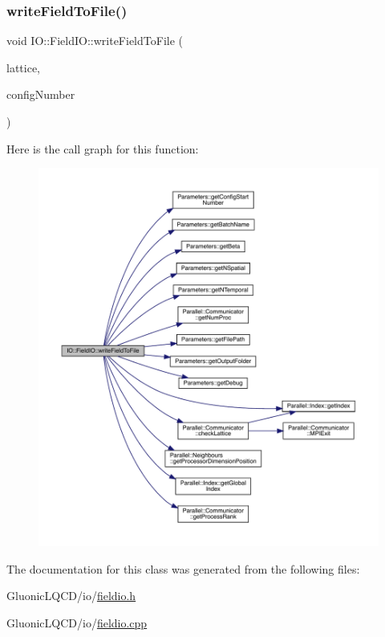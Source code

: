 \subsubsection{\texorpdfstring{writeFieldToFile()}{writeFieldToFile()}}
{\footnotesize\ttfamily void I\+O\+::\+Field\+I\+O\+::write\+Field\+To\+File (\begin{DoxyParamCaption}\item[{\mbox{\hyperlink{class_lattice}{Lattice}}$<$ \mbox{\hyperlink{class_s_u3}{S\+U3}} $>$ $\ast$}]{lattice,  }\item[{unsigned int}]{config\+Number }\end{DoxyParamCaption})\hspace{0.3cm}{\ttfamily [static]}}

Here is the call graph for this function\+:\nopagebreak
\begin{figure}[H]
\begin{center}
\leavevmode
\includegraphics[width=350pt]{class_i_o_1_1_field_i_o_a44dc4aa1786974c091082c5b37be73a1_cgraph}
\end{center}
\end{figure}


The documentation for this class was generated from the following files\+:\begin{DoxyCompactItemize}
\item 
Gluonic\+L\+Q\+C\+D/io/\mbox{\hyperlink{fieldio_8h}{fieldio.\+h}}\item 
Gluonic\+L\+Q\+C\+D/io/\mbox{\hyperlink{fieldio_8cpp}{fieldio.\+cpp}}\end{DoxyCompactItemize}

